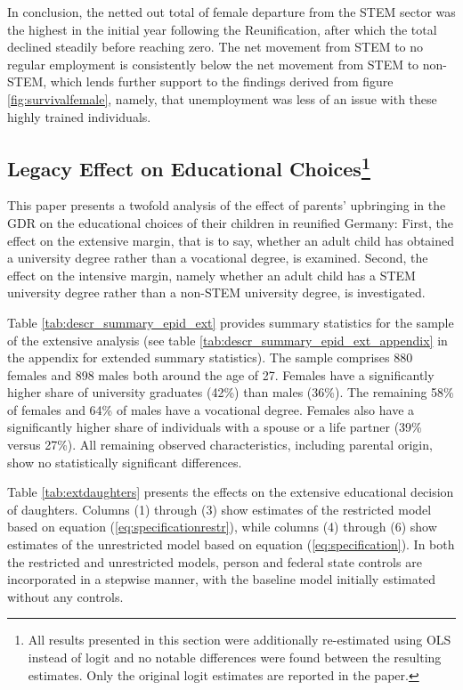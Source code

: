 \documentclass[a4paper, oneside, hyperfootnotes = false]{article}
\begin{document}
{In conclusion, the netted out total of female departure from the STEM sector was the highest in the initial year following the Reunification, after which the total declined steadily before reaching zero.
The net movement from STEM to no regular employment is consistently below the net movement from STEM to non-STEM, which lends further support to the findings derived from figure \ref{fig:survivalfemale}, namely, that unemployment was less of an issue with these highly trained individuals.

 \subsection[Legacy Effect on Educational Choices]{Legacy Effect on Educational Choices\footnote{All results presented in this section were additionally re-estimated using OLS instead of logit and no notable differences were found between the resulting estimates. Only the original logit estimates are reported in the paper.}}
\label{educational}

This paper presents a twofold analysis of the effect of parents' upbringing in the GDR on the educational choices of their children in reunified Germany:
First, the effect on the extensive margin, that is to say, whether an adult child has obtained a university degree rather than a vocational degree, is examined.
Second, the effect on the intensive margin, namely whether an adult child has a STEM university degree rather than a non-STEM university degree, is investigated.

Table \ref{tab:descr_summary_epid_ext} provides summary statistics for the sample of the extensive analysis (see table \ref{tab:descr_summary_epid_ext_appendix} in the appendix for extended summary statistics).
The sample comprises 880 females and 898 males both around the age of 27.
Females have a significantly higher share of university graduates (42\%) than males (36\%).
The remaining 58\% of females and 64\% of males have a vocational degree.
Females also have a significantly higher share of individuals with a spouse or a life partner (39\% versus 27\%).
All remaining observed characteristics, including parental origin, show no statistically significant differences.

Table \ref{tab:extdaughters} presents the effects on the extensive educational decision of daughters.
Columns (1) through (3) show estimates of the restricted model based on equation (\ref{eq:specificationrestr}), while columns (4) through (6) show estimates of the unrestricted model based on equation (\ref{eq:specification}).
In both the restricted and unrestricted models, person and federal state controls are incorporated in a stepwise manner, with the baseline model initially estimated without any controls.

}
\end{document}
